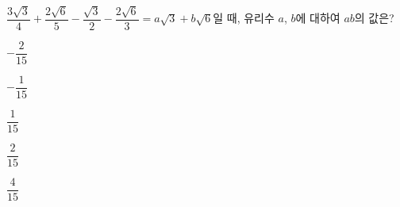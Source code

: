 $\dfrac{3\sqrt{3}}{4}+\dfrac{2\sqrt{6}}{5}-\dfrac{\sqrt{3}}{2}-\dfrac{2\sqrt{6}}{3}=a\sqrt{3}+b\sqrt{6}$일 때, 유리수 $a$, $b$에 대하여 $ab$의 값은?
\begin{choices32}{\rule[-3ex]{0pt}{8ex}$-\dfrac{2}{15}$}{\rule[-3ex]{0pt}{8ex}$-\dfrac{1}{15}$}{\rule[-3ex]{0pt}{8ex}$\dfrac{1}{15}$}{\rule[-3ex]{0pt}{8ex}$\dfrac{2}{15}$}{\rule[-3ex]{0pt}{8ex}$\dfrac{4}{15}$}\end{choices32}
